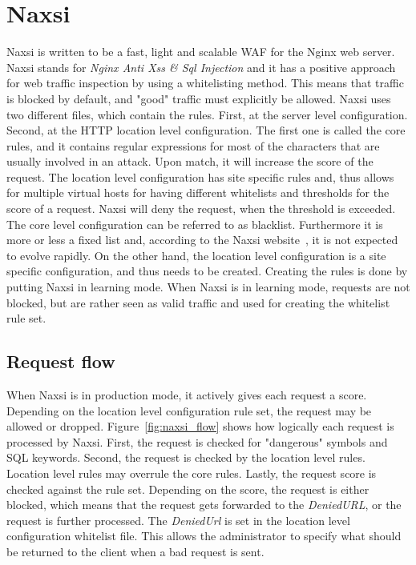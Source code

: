 \documentclass[Naxsi]{subfiles}
\begin{document}
\section{Naxsi}
\label{sec:Naxsi}
Naxsi is written to be a fast, light and scalable \ac{WAF} for the Nginx web server. Naxsi stands for \textit{Nginx Anti Xss \& Sql Injection} and it has a positive approach for web traffic inspection by using a whitelisting method. This means that traffic is blocked by default, and "good" traffic must explicitly be allowed. Naxsi uses two different files, which contain the rules. First, at the server level configuration. Second, at the HTTP location level configuration. The first one is called the core rules, and it contains regular expressions for most of the characters that are usually involved in an attack. Upon match, it will increase the score of the request. The location level configuration has site specific rules and, thus allows for multiple virtual hosts for having different whitelists and thresholds for the score of a request. Naxsi will deny the request, when the threshold is exceeded. The core level configuration can be referred to as blacklist. Furthermore it is more or less a fixed list and, according to the Naxsi website~\cite{naxsi2013}, it is not expected to evolve rapidly. On the other hand, the location level configuration is a site specific configuration, and thus needs to be created. Creating the rules is done by putting Naxsi in learning mode. When Naxsi is in learning mode, requests are not blocked, but are rather seen as valid traffic and used for creating the whitelist rule set.

\subsection{Request flow}
When Naxsi is in production mode, it actively gives each request a score. Depending on the location level configuration rule set, the request may be allowed or dropped. Figure~\ref{fig:naxsi_flow} shows how logically each request is processed by Naxsi. First, the request is checked for "dangerous" symbols and SQL keywords. Second, the request is checked by the location level rules. Location level rules may overrule the core rules. Lastly, the request score is checked against the rule set. Depending on the score, the request is either blocked, which means that the request gets forwarded to the \textit{DeniedURL}, or the request is further processed. The \textit{DeniedUrl} is set in the location level configuration whitelist file. This allows the administrator to specify what should be returned to the client when a bad request is sent.
\end{document}
